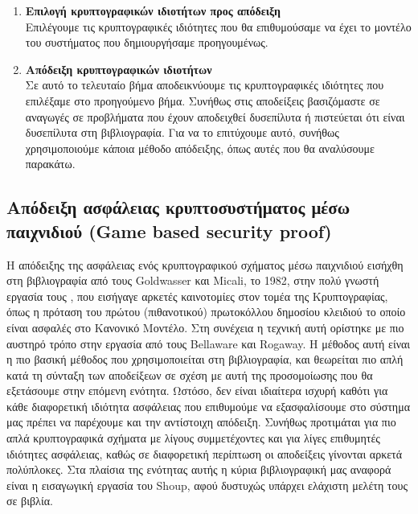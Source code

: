 \begin{enumerate}
    \item \textbf{Επιλογή κρυπτογραφικών ιδιοτήτων προς απόδειξη}\\
    Επιλέγουμε τις κρυπτογραφικές ιδιότητες που θα επιθυμούσαμε να έχει το μοντέλο του συστήματος που δημιουργήσαμε προηγουμένως. 
    \item \textbf{Απόδειξη κρυπτογραφικών ιδιοτήτων}\\
    Σε αυτό το τελευταίο βήμα αποδεικνύουμε τις κρυπτογραφικές ιδιότητες που επιλέξαμε στο προηγούμενο βήμα. Συνήθως στις αποδείξεις βασιζόμαστε σε αναγωγές σε προβλήματα που έχουν αποδειχθεί δυσεπίλυτα ή πιστεύεται ότι είναι δυσεπίλυτα στη βιβλιογραφία. Για να το επιτύχουμε αυτό, συνήθως χρησιμοποιούμε κάποια μέθοδο απόδειξης, όπως αυτές που θα αναλύσουμε παρακάτω.
\end{enumerate}

\subsection{Απόδειξη ασφάλειας κρυπτοσυστήματος μέσω παιχνιδιού (Game based security proof)}

H απόδειξης της ασφάλειας ενός κρυπτογραφικού σχήματος μέσω παιχνιδιού εισήχθη στη βιβλιογραφία από τους Goldwasser και Micali, το 1982, στην πολύ γνωστή εργασία τους \cite{10.1145/800070.802212}, που εισήγαγε αρκετές καινοτομίες στον τομέα της Κρυπτογραφίας, όπως η πρόταση του πρώτου (πιθανοτικού) πρωτοκόλλου δημοσίου κλειδιού το οποίο είναι ασφαλές στο Κανονικό Μοντέλο. Στη συνέχεια η τεχνική αυτή ορίστηκε με πιο αυστηρό τρόπο στην εργασία \cite{bellare2004game} από τους Bellaware και Rogaway. Η μέθοδος αυτή είναι η πιο βασική μέθοδος που χρησιμοποιείται στη βιβλιογραφία, και θεωρείται πιο απλή κατά τη σύνταξη των αποδείξεων σε σχέση με αυτή της προσομοίωσης που θα εξετάσουμε στην επόμενη ενότητα. Ωστόσο, δεν είναι ιδιαίτερα ισχυρή καθότι για κάθε διαφορετική ιδιότητα ασφάλειας που επιθυμούμε να εξασφαλίσουμε στο σύστημα μας πρέπει να παρέχουμε και την αντίστοιχη απόδειξη. Συνήθως προτιμάται για πιο απλά κρυπτογραφικά σχήματα με λίγους συμμετέχοντες και για λίγες επιθυμητές ιδιότητες ασφάλειας, καθώς σε διαφορετική περίπτωση οι αποδείξεις γίνονται αρκετά πολύπλοκες. Στα πλαίσια της ενότητας αυτής η κύρια βιβλιογραφική μας αναφορά είναι η εισαγωγική εργασία \cite{cryptoeprint:2004/332} του Shoup, αφού δυστυχώς υπάρχει ελάχιστη μελέτη τους σε βιβλία.

